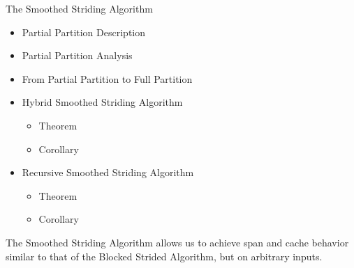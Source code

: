 \documentclass{beamer}
\begin{document}
\begin{frame}[t]{The Smoothed Striding Algorithm}
	\begin{itemize}
		\item Partial Partition Description
		\item Partial Partition Analysis 
		\item From Partial Partition to Full Partition
		\item Hybrid Smoothed Striding Algorithm
		\begin{itemize}
			\item Theorem
			\item Corollary
		\end{itemize}
		\item Recursive Smoothed Striding Algorithm
		\begin{itemize}
			\item Theorem
			\item Corollary
		\end{itemize}
	\end{itemize}
The Smoothed Striding Algorithm allows us to achieve span and cache behavior similar to that of the Blocked Strided Algorithm, but on arbitrary inputs.
\end{frame}
\end{document}
